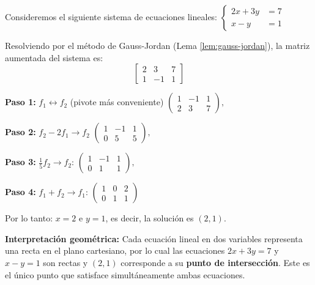 \begin{example}
Consideremos el siguiente sistema de ecuaciones lineales:
$\begin{cases}
2x + 3y &= 7 \\
x - y &= 1
\end{cases}$
\begin{myproof} Resolviendo por el método de Gauss-Jordan (Lema \ref{lem:gauss-jordan}), la matriz aumentada del sistema es:
$$\left[\begin{array}{cc|c}
2 & 3 & 7 \\
1 & -1 & 1
\end{array}\right]$$

\textbf{Paso 1:} $f_1\leftrightarrow f_2$ (pivote más conveniente) $\left(\begin{array}{cc|c}
1 & -1 & 1 \\
2 & 3 & 7
\end{array}\right),$

\textbf{Paso 2:} $f_2 - 2f_1 \rightarrow f_2$ $\left(\begin{array}{cc|c}
1 & -1 & 1 \\
0 & 5 & 5
\end{array}\right),$

\textbf{Paso 3:} $\frac{1}{5}f_2 \rightarrow f_2$: $\left(\begin{array}{cc|c}
1 & -1 & 1 \\
0 & 1 & 1
\end{array}\right),$

\textbf{Paso 4:} $f_1 + f_2 \rightarrow f_1$: $\left(\begin{array}{cc|c}
1 & 0 & 2 \\
0 & 1 & 1
\end{array}\right)$

Por lo tanto: $x = 2$ e $y = 1$, es decir, la solución es $(2, 1)$.

\textbf{Interpretación geométrica:}
Cada ecuación lineal en dos variables representa una recta en el plano cartesiano, por lo cual las ecuaciones $2x + 3y = 7$ y $x - y = 1$ son rectas y $(2, 1)$ corresponde a su \textbf{punto de intersección}. Este es el único punto que satisface simultáneamente ambas ecuaciones.

\begin{figure}[H]
\centering
{}
\end{figure}
\end{myproof}
\end{example}
